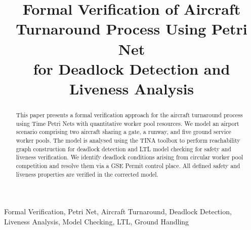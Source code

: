 \documentclass[conference]{IEEEtran}
\begin{document}
\title{Formal Verification of Aircraft Turnaround Process Using Petri Net\\
for Deadlock Detection and Liveness Analysis}

\author{
  \and
  \and
}

\maketitle

\begin{abstract}
This paper presents a formal verification approach for the aircraft turnaround
process using Time Petri Nets with quantitative worker pool resources. We model
an airport scenario comprising two aircraft sharing a gate, a runway, and five
ground service worker pools. The model is analysed using the TINA toolbox to
perform reachability graph construction for deadlock detection and LTL model
checking for safety and liveness verification. We identify deadlock conditions
arising from circular worker pool competition and resolve them via a GSE Permit
control place. All defined safety and liveness properties are verified in the
corrected model.
\end{abstract}

\begin{IEEEkeywords}
Formal Verification, Petri Net, Aircraft Turnaround, Deadlock Detection,
Liveness Analysis, Model Checking, LTL, Ground Handling
\end{IEEEkeywords}


\end{document}
